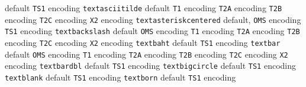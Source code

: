 \documentclass[twoside]{ltxdoc}
\makeatletter
\renewenvironment{theindex}{%
   \@restonecoltrue
   \if@twocolumn\@restonecolfalse\fi
   \columnseprule \z@
   \columnsep 35\p@
   \twocolumn[\index@prologue]%
   \IndexParms
   \let\item\@idxitem
   \ignorespaces
}{\if@restonecol\onecolumn\else\clearpage\fi}
\makeatother
\begin{document}
\begin{theindex}
    \subitem default\pfill {}
    \subitem \texttt  {TS1} encoding\pfill {}
  \item \texttt  {textasciitilde}\efill 
    \subitem default\pfill {}
    \subitem \texttt  {T1} encoding\pfill {}
    \subitem \texttt  {T2A} encoding\pfill {}
    \subitem \texttt  {T2B} encoding\pfill {}
    \subitem \texttt  {T2C} encoding\pfill {}
    \subitem \texttt  {X2} encoding\pfill {}
  \item \texttt  {textasteriskcentered}\efill 
    \subitem default\pfill {}, 
    \subitem \texttt  {OMS} encoding\pfill {}
    \subitem \texttt  {TS1} encoding\pfill {}
  \item \texttt  {textbackslash}\efill 
    \subitem default\pfill {}
    \subitem \texttt  {OMS} encoding\pfill {}
    \subitem \texttt  {T1} encoding\pfill {}
    \subitem \texttt  {T2A} encoding\pfill {}
    \subitem \texttt  {T2B} encoding\pfill {}
    \subitem \texttt  {T2C} encoding\pfill {}
    \subitem \texttt  {X2} encoding\pfill {}
  \item \texttt  {textbaht}\efill 
    \subitem default\pfill {}
    \subitem \texttt  {TS1} encoding\pfill {}
  \item \texttt  {textbar}\efill 
    \subitem default\pfill {}
    \subitem \texttt  {OMS} encoding\pfill {}
    \subitem \texttt  {T1} encoding\pfill {}
    \subitem \texttt  {T2A} encoding\pfill {}
    \subitem \texttt  {T2B} encoding\pfill {}
    \subitem \texttt  {T2C} encoding\pfill {}
    \subitem \texttt  {X2} encoding\pfill {}
  \item \texttt  {textbardbl}\efill 
    \subitem default\pfill {}
    \subitem \texttt  {TS1} encoding\pfill {}
  \item \texttt  {textbigcircle}\efill 
    \subitem default\pfill {}
    \subitem \texttt  {TS1} encoding\pfill {}
  \item \texttt  {textblank}\efill 
    \subitem default\pfill {}
    \subitem \texttt  {TS1} encoding\pfill {}
  \item \texttt  {textborn}\efill 
    \subitem default\pfill {}
    \subitem \texttt  {TS1} encoding\pfill {}

\end{theindex}
\end{document}
